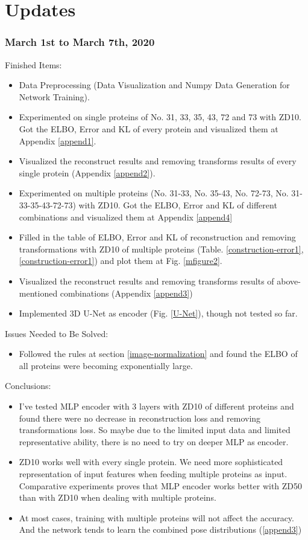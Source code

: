 \section{Updates}
\subsubsection*{March 1st to March 7th, 2020}

Finished Items:

\begin{itemize}
    \item Data Preprocessing (Data Visualization and Numpy Data Generation for Network Training).
    \item Experimented on single proteins of No. 31, 33, 35, 43, 72 and 73 with ZD10. Got the ELBO, Error and KL of every protein and visualized them at Appendix \ref{append1}.
    \item Visualized the reconstruct results and removing transforms results of every single protein (Appendix \ref{append2}).
    \item Experimented on multiple proteins (No. 31-33, No. 35-43, No. 72-73, No. 31-33-35-43-72-73) with ZD10. Got the ELBO, Error and KL of different combinations and visualized them at Appendix \ref{append4}
    \item Filled in the table of ELBO, Error and KL of reconstruction and removing transformations with ZD10 of multiple proteins (Table. \ref{construction-error1}, \ref{construction-error1}) and plot them at Fig. \ref{mfigure2}.
    \item Visualized the reconstruct results and removing transforms results of above-mentioned combinations (Appendix \ref{append3})
    \item Implemented 3D U-Net as encoder (Fig. \ref{U-Net}), though not tested so far.
\end{itemize}

Issues Needed to Be Solved:

\begin{itemize}
    \item Followed the rules at section \ref{image-normalization} and found the ELBO of all proteins were becoming exponentially large.
\end{itemize}

Conclusions:
\begin{itemize}
    \item I've tested MLP encoder with 3 layers with ZD10 of different proteins and found there were no decrease in reconstruction loss and removing transformations loss. So maybe due to the limited input data and limited representative ability, there is no need to try on deeper MLP as encoder.
    \item ZD10 works well with every single protein. We need more sophisticated representation of input features when feeding multiple proteins as input. Comparative experiments proves that MLP encoder works better with ZD50 than with ZD10 when dealing with multiple proteins.
    \item At most cases, training with multiple proteins will not affect the accuracy. And the network tends to learn the combined pose distributions (\ref{append3})
\end{itemize}

